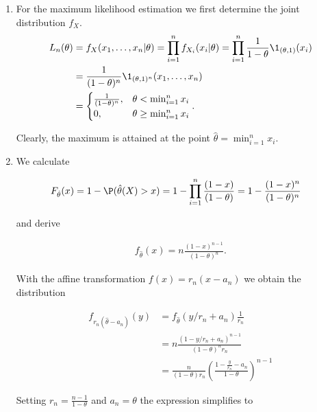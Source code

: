 \begin{solution}

\phantom{}

\begin{enumerate}[label = (\alph*)]
  \item For the maximum likelihood estimation we first determine the
  joint distribution $f_X$.
  \begin{align*}
    L_n(\theta) &= f_X(x_1,\dots,x_n | \theta) 
    = \prod_{i=1}^n f_{X_i}(x_i | \theta)
    = \prod_{i=1}^n \frac{1}{1-\theta}\1_{(\theta,1)}(x_i) \\
    &= \frac{1}{(1-\theta)^n}\1_{(\theta,1)^n}(x_1,\dots,x_n)\\
    &= \begin{cases}
      \frac{1}{(1-\theta)^n}, & \theta < \min_{i=1}^n x_i \\
      0, & \theta \geq \min_{i=1}^n x_i
    \end{cases}.
  \end{align*}

  Clearly, the maximum is attained at the point 
  $\hat{\theta} = \min_{i=1}^n x_i$.

  \item We calculate
  
  \begin{align*}
    F_{\hat{\theta}}(x) &= 1 - \P(\hat{\theta}(X) > x)
    = 1 - \prod_{i=1}^n \frac{(1-x)}{(1-\theta)}
    = 1 - \frac{(1-x)^n}{(1-\theta)^n}
  \end{align*}

  and derive

  \begin{align*}
    f_{\hat{\theta}}(x) = n\frac{(1-x)^{n-1}}{(1-\theta)^{n}}.
  \end{align*}

  

  With the affine transformation $f(x) = r_n(x - a_n)$
  we obtain the distribution

  \begin{align*}
    f_{r_n(\hat{\theta} - a_n)}(y)
    &= f_{\hat{\theta}}(y/r_n + a_n)\frac{1}{r_n} \\
    &= n\frac{(1-y/r_n + a_n)^{n-1}}{(1-\theta)^{n}r_n} \\
    &= \frac{n}{(1- \theta)r_n} \left(\frac{1 - \frac{y}{r_n} - a_n}{1 - \theta}\right)^{n-1}
  \end{align*}

  Setting $r_n = \frac{n - 1}{1 - \theta}$ and $a_n = \theta$ the expression simplifies to
  

\end{enumerate}
\end{solution}
